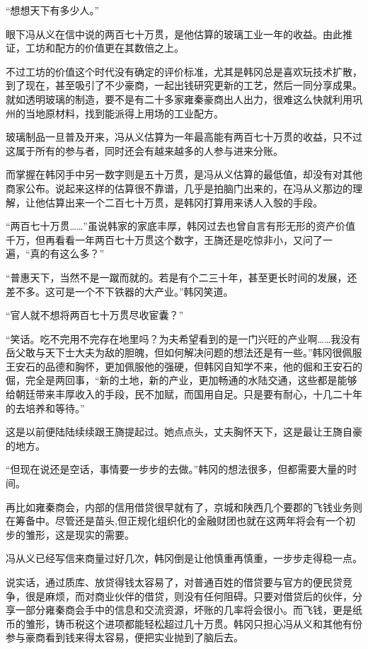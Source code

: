 “想想天下有多少人。”

眼下冯从义在信中说的两百七十万贯，是他估算的玻璃工业一年的收益。由此推证，工坊和配方的价值更在其数倍之上。

不过工坊的价值这个时代没有确定的评价标准，尤其是韩冈总是喜欢玩技术扩散，到了现在，甚至吸引了不少豪商，一起出钱研究更新的工艺，然后一同分享成果。就如透明玻璃的制造，要不是有二十多家雍秦豪商出人出力，很难这么快就利用巩州的当地原材料，找到能派得上用场的工业配方。

玻璃制品一旦普及开来，冯从义估算为一年最高能有两百七十万贯的收益，只不过这属于所有的参与者，同时还会有越来越多的人参与进来分账。

而掌握在韩冈手中另一数字则是五十万贯，是冯从义估算的最低值，却没有对其他商家公布。说起来这样的估算很不靠谱，几乎是拍脑门出来的，在冯从义那边的理解，让他估算出来一个二百七十万贯，是韩冈打算用来诱人入彀的手段。

“两百七十万贯……”虽说韩家的家底丰厚，韩冈过去也曾自言有形无形的资产价值千万，但再看看一年两百七十万贯这个数字，王旖还是吃惊非小，又问了一遍，“真的有这么多？”

“普惠天下，当然不是一蹴而就的。若是有个二三十年，甚至更长时间的发展，还差不多。这可是一个不下铁器的大产业。”韩冈笑道。

“官人就不想将两百七十万贯尽收宦囊？”

“笑话。吃不完用不完存在地里吗？为夫希望看到的是一门兴旺的产业啊……我没有岳父敢与天下士大夫为敌的胆魄，但如何解决问题的想法还是有一些。”韩冈很佩服王安石的品德和胸怀，更加佩服他的强硬，但韩冈自知学不来，他的倔和王安石的倔，完全是两回事，“新的土地，新的产业，更加畅通的水陆交通，这些都是能够给朝廷带来丰厚收入的手段，民不加赋，而国用自足。只是要有耐心，十几二十年的去培养和等待。”

这是以前便陆陆续续跟王旖提起过。她点点头，丈夫胸怀天下，这是最让王旖自豪的地方。

“但现在说还是空话，事情要一步步的去做。”韩冈的想法很多，但都需要大量的时间。

再比如雍秦商会，内部的信用借贷很早就有了，京城和陕西几个要郡的飞钱业务则在筹备中。尽管还是苗头,但正规化组织化的金融财团也就在这两年将会有一个初步的雏形，这是现实的需要。

冯从义已经写信来商量过好几次，韩冈倒是让他慎重再慎重，一步步走得稳一点。

说实话，通过质库、放贷得钱太容易了，对普通百姓的借贷要与官方的便民贷竞争，很是麻烦，而对商业伙伴的借贷，则没有任何阻碍。只要对借贷后的伙伴，分享一部分雍秦商会手中的信息和交流资源，坏账的几率将会很小。而飞钱，更是纸币的雏形，铸币税这个进项都能轻松超过几十万贯。韩冈只担心冯从义和其他有份参与豪商看到钱来得太容易，便把实业抛到了脑后去。

